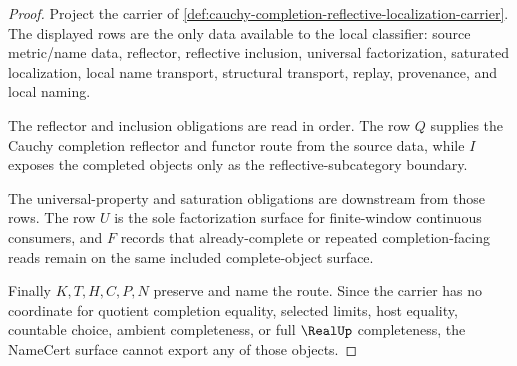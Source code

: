 \begin{proof}
Project the carrier of \autoref{def:cauchy-completion-reflective-localization-carrier}. The displayed rows are the only data available to the local classifier: source metric/name data, reflector, reflective inclusion, universal factorization, saturated localization, local name transport, structural transport, replay, provenance, and local naming.

The reflector and inclusion obligations are read in order. The row $Q$ supplies the Cauchy completion reflector and functor route from the source data, while $I$ exposes the completed objects only as the reflective-subcategory boundary.

The universal-property and saturation obligations are downstream from those rows. The row $U$ is the sole factorization surface for finite-window continuous consumers, and $F$ records that already-complete or repeated completion-facing reads remain on the same included complete-object surface.

Finally $K,T,H,C,P,N$ preserve and name the route. Since the carrier has no coordinate for quotient completion equality, selected limits, host equality, countable choice, ambient completeness, or full $\RealUp$ completeness, the NameCert surface cannot export any of those objects.
\end{proof}

